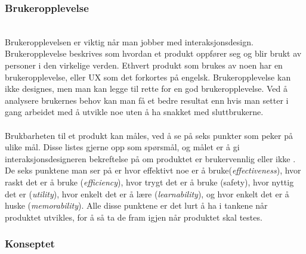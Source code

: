 \subsubsection{Brukeropplevelse}\\
Brukeropplevelsen er viktig når man jobber med interaksjonsdesign. Brukeropplevelse beskrives som hvordan et produkt oppfører seg og blir brukt av personer i den virkelige verden\cite[s.~12]{preece}. Ethvert produkt som brukes av noen har en brukeropplevelse, eller UX som det forkortes på engelsk. Brukeropplevelse kan ikke designes, men man kan legge til rette for en god brukeropplevelse. Ved å analysere brukernes behov kan man få et bedre resultat enn hvis man setter i gang arbeidet med å utvikle noe uten å ha snakket med sluttbrukerne.
\\\\
Brukbarheten til et produkt kan måles, ved å se på seks punkter som peker på ulike mål. Disse listes gjerne opp som spørsmål, og målet er å gi interaksjonsdesigneren bekreftelse på om produktet er brukervennlig eller ikke \cite[s.~19]{preece}. De seks punktene man ser på er hvor effektivt noe er å bruke(\textit{effectiveness}), hvor raskt det er å bruke (\textit{efficiency}), hvor trygt det er å bruke (safety), hvor nyttig det er (\textit{utility}), hvor enkelt det er å lære (\textit{learnability}), og hvor enkelt det er å huske (\textit{memorability}). Alle disse punktene er det lurt å ha i tankene når produktet utvikles, for å så ta de fram igjen når produktet skal testes.

\subsubsection{Konseptet}
\label{konseptet}

